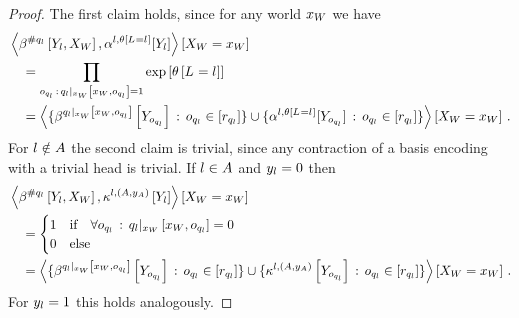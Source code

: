 \begin{proof}
    The first claim holds, since for any world $x_{W}$ we have
    \begin{align*}
        &\left\langle \beta^{\#q_{l}}\left[Y_{l},X_{W}\right],\alpha^{l,\theta\left[L_{}=l_{}\right]}[Y_{l}]\right\rangle \left[ X_{W}=x_{W} \right] \\
        &\quad = \prod_{o_{q_{l}}\,:\,{q_{l}}|_{x_{W}} \left[x_{W},o_{q_{l}}\right]=1} \mathrm{exp}\left[\theta\left[L_{}=l_{}\right]\right] \\
        &\quad = \left\langle 
            \{\beta^{{q_{l}}|_{x_{W}} \left[x_{W},o_{q_{l}}\right]}\left[Y_{o_{q_{l}}}\right] \,:\, o_{q_{l}}\in[r_{q_{l}}]\}
            \cup
            \{\alpha^{l,\theta\left[L_{}=l_{}\right]}[Y_{o_{q_{l}}}] \,:\, o_{q_{l}}\in[r_{q_{l}}]\}
        \right\rangle \left[ X_{W}=x_{W} \right] \, .
    \end{align*}
    For $l\notin A$ the second claim is trivial, since any contraction of a basis encoding with a trivial head is trivial.
    If $l\in A$ and $y_{l}=0$ then
    \begin{align*}
        &\left\langle \beta^{\#q_{l}}\left[Y_{l},X_{W}\right],\kappa^{l,(A,y_{A})}\left[Y_{l}\right]\right\rangle \left[ X_{W}=x_{W} \right] \\
        &\quad=
        \begin{cases}
            1 & \text{if}\quad \forall o_{q_{l}} \,:\,  {q_{l}}|_{x_{W}} \left[x_{W},o_{q_{l}}\right] = 0\\
            0 & \text{else}
        \end{cases} \\
        &\quad= \left\langle 
            \{\beta^{{q_{l}}|_{x_{W}} \left[x_{W},o_{q_{l}}\right]}\left[Y_{o_{q_{l}}}\right] \,:\, o_{q_{l}}\in[r_{q_{l}}]\}
            \cup
            \{\kappa^{l,(A,y_{A})}\left[Y_{o_{q_{l}}}\right] \,:\, o_{q_{l}}\in[r_{q_{l}}]\}
        \right\rangle \left[ X_{W}=x_{W} \right] \, .
    \end{align*}
    For $y_{l}=1$ this holds analogously.
\end{proof}

